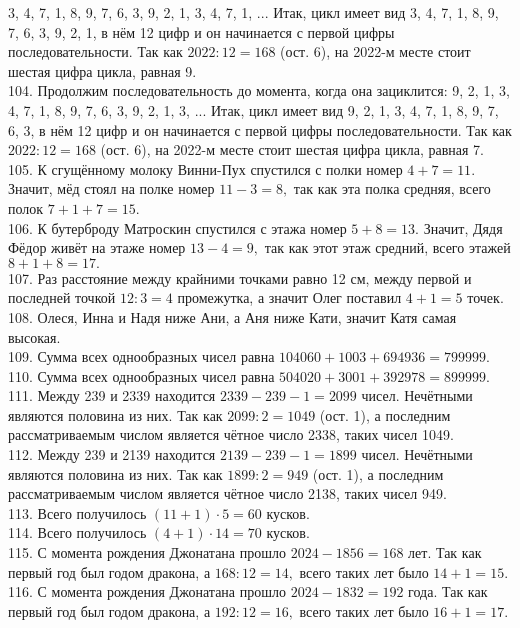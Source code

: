 3, 4, 7, 1, 8, 9, 7, 6, 3, 9, 2, 1, 3, 4, 7, 1, ... Итак, цикл имеет вид
3, 4, 7, 1, 8, 9, 7, 6, 3, 9, 2, 1, в нём 12 цифр и он начинается с первой цифры последовательности. Так как $2022:12=168$ (ост. 6), на 2022-м месте стоит шестая цифра цикла, равная 9.\\
104. Продолжим последовательность до момента, когда она зациклится:
9, 2, 1, 3, 4, 7, 1, 8, 9, 7, 6, 3, 9, 2, 1, 3, ... Итак, цикл имеет вид
9, 2, 1, 3, 4, 7, 1, 8, 9, 7, 6, 3, в нём 12 цифр и он начинается с первой цифры последовательности. Так как $2022:12=168$ (ост. 6), на 2022-м месте стоит шестая цифра цикла, равная 7.\\
105. К сгущённому молоку Винни-Пух спустился с полки номер $4+7=11.$ Значит, мёд стоял на полке номер $11-3=8,$ так как эта полка средняя, всего полок $7+1+7=15.$\\
106. К бутерброду Матроскин спустился с этажа номер $5+8=13.$ Значит, Дядя Фёдор живёт на этаже номер $13-4=9,$ так как этот этаж средний, всего этажей $8+1+8=17.$\\
107. Раз расстояние между крайними точками равно 12 см, между первой и последней точкой $12:3=4$ промежутка, а значит Олег поставил $4+1=5$ точек.\\
108. Олеся, Инна и Надя ниже Ани, а Аня ниже Кати, значит Катя самая высокая.\\
109. Сумма всех однообразных чисел равна $104060+1003+694936=799999.$\\
110. Сумма всех однообразных чисел равна $504020+3001+392978=899999.$\\
111. Между 239 и 2339 находится $2339-239-1=2099$ чисел. Нечётными являются половина из них. Так как $2099:2=1049$ (ост. 1), а последним рассматриваемым числом является чётное число 2338, таких чисел 1049.\\
112. Между 239 и 2139 находится $2139-239-1=1899$ чисел. Нечётными являются половина из них. Так как $1899:2=949$ (ост. 1), а последним рассматриваемым числом является чётное число 2138, таких чисел 949.\\
113. Всего получилось $(11+1)\cdot5=60$ кусков.\\
114. Всего получилось $(4+1)\cdot14=70$ кусков.\\
115. С момента рождения Джонатана прошло $2024-1856=168$ лет. Так как первый год был годом дракона, а $168:12=14,$  всего таких лет было $14+1=15.$\\
116. С момента рождения Джонатана прошло $2024-1832=192$ года. Так как первый год был годом дракона, а $192:12=16,$  всего таких лет было $16+1=17.$\\

